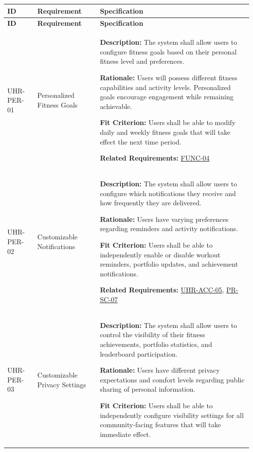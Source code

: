 \documentclass[12pt]{article}
\begin{document}
\small
\setlength{\tabcolsep}{4pt}
\begin{xltabular}{\textwidth}{|p{2.6cm}|p{3.4cm}|X|}
\hline
\textbf{ID} & \textbf{Requirement} & \textbf{Specification} \\
\hline
\endfirsthead
\hline
\textbf{ID} & \textbf{Requirement} & \textbf{Specification} \\
\hline
\endhead

UHR-PER-01\hypertarget{req:UHR-PER-01}{} &
Personalized Fitness Goals &
\textbf{Description:} The system shall allow users to configure fitness goals based on their personal fitness level and preferences.

\textbf{Rationale:} Users will possess different fitness capabilities and activity levels. Personalized goals encourage engagement while remaining achievable.

\textbf{Fit Criterion:} Users shall be able to modify daily and weekly fitness goals that will take effect the next time period.

\textbf{Related Requirements:} \hyperlink{req:FUNC-04}{FUNC-04}\\
\hline

UHR-PER-02\hypertarget{req:UHR-PER-02}{} &
Customizable Notifications &
\textbf{Description:} The system shall allow users to configure which notifications they receive and how frequently they are delivered.

\textbf{Rationale:} Users have varying preferences regarding reminders and activity notifications.

\textbf{Fit Criterion:} Users shall be able to independently enable or disable workout reminders, portfolio updates, and achievement notifications.

\textbf{Related Requirements:} \hyperlink{req:UHR-ACC-05}{UHR-ACC-05}, \hyperlink{req:PR-SC-07}{PR-SC-07}\\
\hline

UHR-PER-03\hypertarget{req:UHR-PER-03}{} &
Customizable Privacy Settings &
\textbf{Description:} The system shall allow users to control the visibility of their fitness achievements, portfolio statistics, and leaderboard participation.

\textbf{Rationale:} Users have different privacy expectations and comfort levels regarding public sharing of personal information.

\textbf{Fit Criterion:} Users shall be able to independently configure visibility settings for all community-facing features that will take immediate effect.


\end{xltabular}
\end{document}
